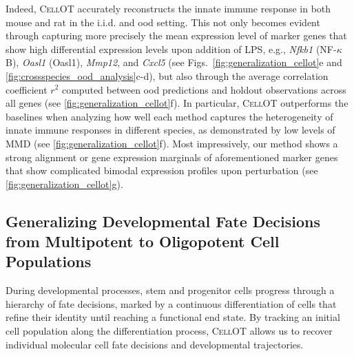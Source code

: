 Indeed, \textsc{CellOT} accurately reconstructs the innate immune response in both mouse and rat in the i.i.d. and \acrshort{ood} setting. This not only becomes evident through capturing more precisely the mean expression level of marker genes that show high differential expression levels upon addition of \acrshort{LPS}, e.g., \textit{Nfkb1} (NF-$\kappa$B), \textit{Oasl1} (Oasl1), \textit{Mmp12}, and \textit{Cxcl5} (see Figs.~\ref{fig:generalization_cellot}e and \ref{fig:crossspecies_ood_analysis}c-d), but also through the average correlation coefficient $r^2$ computed between \acrshort{ood} predictions and holdout observations across all genes (see \cref{fig:generalization_cellot}f).
In particular, \textsc{CellOT} outperforms the baselines when analyzing how well each method captures the heterogeneity of innate immune responses in different species, as demonstrated by low levels of \acrshort{MMD} (see \cref{fig:generalization_cellot}f).
Most impressively, our method shows a strong alignment or gene expression marginals of aforementioned marker genes that show complicated bimodal expression profiles upon perturbation (see \cref{fig:generalization_cellot}g).


\subsection{Generalizing Developmental Fate Decisions from Multipotent to Oligopotent Cell Populations}

 During developmental processes, stem and progenitor cells progress through a hierarchy of fate decisions, marked by a continuous differentiation of cells that refine their identity until reaching a functional end state.
By tracking an initial cell population along the differentiation process, \textsc{CellOT} allows us to recover individual molecular cell fate decisions and developmental trajectories. 

